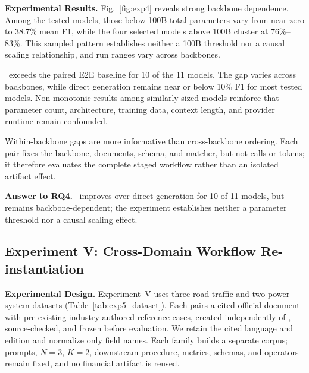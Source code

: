 \noindent
\textbf{Experimental Results.}
Fig.~\ref{fig:exp4} reveals strong backbone dependence. Among the tested
models, those below 100B total parameters vary from near-zero to 38.7\% mean F1,
while the four selected models above 100B cluster at
76\%--83\%. This sampled pattern establishes neither a 100B threshold nor a
causal scaling relationship, and run ranges vary across backbones.

\ourtool\ exceeds the paired E2E baseline for 10 of the 11 models. The gap
varies across backbones, while direct generation remains near or below 10\% F1
for most tested models. Non-monotonic results among similarly sized models
reinforce that parameter count, architecture, training data, context length, and
provider runtime remain confounded.

Within-backbone gaps are more informative than cross-backbone ordering. Each
pair fixes the backbone, documents, schema, and matcher, but not calls or
tokens; it therefore evaluates the complete staged workflow rather than an
isolated artifact effect.


\noindent\textbf{Answer to RQ4.}
\ourtool\ improves over direct generation for 10 of 11 models, but remains
backbone-dependent; the experiment establishes neither a parameter threshold
nor a causal scaling effect.















\subsection{Experiment V: Cross-Domain Workflow Re-instantiation}
\label{sec:exp5}

\noindent
\textbf{Experimental Design.}
Experiment~V uses three road-traffic and two power-system datasets
(Table~\ref{tab:exp5_dataset}). Each pairs a cited official document with
pre-existing industry-authored reference cases, created independently of
\ourtool, source-checked, and frozen before evaluation. We retain the cited
language and edition and normalize only field names. Each family builds a
separate corpus; prompts, $N=3$, $K=2$, downstream procedure, metrics, schemas,
and operators remain fixed, and no financial artifact is reused.

